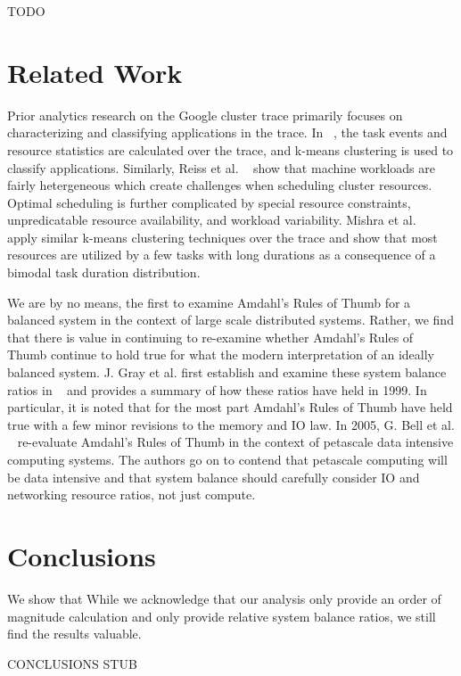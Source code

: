 \documentclass{sig-alternate}
\begin{document}
TODO

\section{Related Work}

Prior analytics research on the Google cluster trace primarily focuses on characterizing and classifying applications in the trace.
In ~\cite{clusterdata:Di2013}, the task events and resource statistics are calculated over the trace, and k-means clustering is used to classify applications.
Similarly, Reiss et al. ~\cite{clusterdata:Reiss2012b} show that machine workloads are fairly hetergeneous which create challenges when scheduling cluster resources.
Optimal scheduling is further complicated by special resource constraints, unpredicatable resource availability, and workload variability.
Mishra et al. ~\cite{clusterdata:Mishra2010} apply similar k-means clustering techniques over the trace and show that most resources are utilized by a few tasks with long durations as a consequence of a bimodal task duration distribution.

We are by no means, the first to examine Amdahl's Rules of Thumb for a balanced system in the context of large scale distributed systems.
Rather, we find that there is value in continuing to re-examine whether Amdahl's Rules of Thumb continue to hold true for what the modern interpretation of an ideally balanced system.
J. Gray et al. first establish and examine these system balance ratios in ~\cite{export:68636} and provides a summary of how these ratios have held in 1999.
In particular, it is noted that for the most part Amdahl's Rules of Thumb have held true with a few minor revisions to the memory and IO law.
In 2005, G. Bell et al. ~\cite{Bell:2006:PCS:1110638.1110681} re-evaluate Amdahl's Rules of Thumb in the context of petascale data intensive computing systems.
The authors go on to contend that petascale computing will be data intensive and that system balance should carefully consider IO and networking resource ratios, not just compute.


\section{Conclusions}

We show that 
While we acknowledge that our analysis only provide an order of magnitude calculation and only provide relative system balance ratios, we still find the results valuable.

CONCLUSIONS STUB






\end{document}
